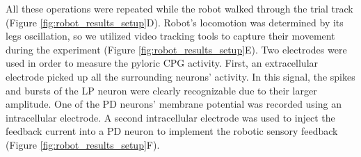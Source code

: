 All these operations were repeated while the robot walked through the trial track (Figure \ref{fig:robot_results_setup}D). Robot's locomotion was determined by its legs oscillation, so we utilized video tracking tools to capture their movement during the experiment (Figure \ref{fig:robot_results_setup}E). Two electrodes were used in order to measure the pyloric CPG activity. First, an extracellular electrode picked up all the surrounding neurons' activity. In this signal, the spikes and bursts of the LP neuron were clearly recognizable due to their larger amplitude. One of the PD neurons' membrane potential was recorded using an intracellular electrode. A second intracellular electrode was used to inject the feedback current into a PD neuron to implement the robotic sensory feedback (Figure \ref{fig:robot_results_setup}F).



